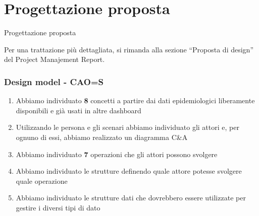 \documentclass[handout]{beamer}
\begin{document}
	\section{Progettazione proposta}
		\begin{frame}
			\centering
			\begin{Huge}
				Progettazione proposta
			\end{Huge}
			\mbox{}
			\vfill
			\vspace*{100px}
			\begin{tiny}
				Per una trattazione più dettagliata, si rimanda alla sezione ``Proposta di design'' del Project Manajement Report.
			\end{tiny}
		\end{frame}
		\begin{frame}
			\frametitle{Design model - CAO=S}
			\begin{enumerate}[<+->]
				\item Abbiamo individuato \textbf{8} concetti a partire dai dati epidemiologici liberamente disponibili e già usati in altre dashboard\\
				\item Utilizzando le persona e gli scenari abbiamo individuato gli attori e, per ognuno di essi, abbiamo realizzato un diagramma C\&A\\
				\item Abbiamo individuato \textbf{7} operazioni che gli attori possono svolgere\\
				\item Abbiamo individuato le strutture definendo quale attore potesse svolgere quale operazione\\
				\item Abbiamo individuato le strutture dati che dovrebbero essere utilizzate per gestire i diversi tipi di dato\\
			\end{enumerate}
		\end{frame}
\end{document}
